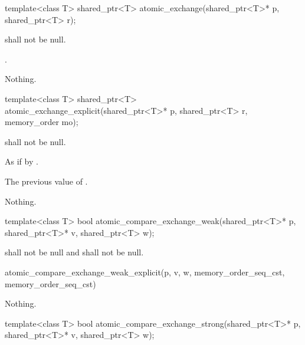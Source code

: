 %
\begin{itemdecl}
template<class T>
  shared_ptr<T> atomic_exchange(shared_ptr<T>* p, shared_ptr<T> r);
\end{itemdecl}

\begin{itemdescr}
\pnum
\requires {} shall not be null.

\pnum
\returns {}.

\pnum
\throws Nothing.
\end{itemdescr}

%
\begin{itemdecl}
template<class T>
  shared_ptr<T> atomic_exchange_explicit(shared_ptr<T>* p, shared_ptr<T> r, memory_order mo);
\end{itemdecl}

\begin{itemdescr}
\pnum
\requires {} shall not be null.

\pnum
\effects As if by .

\pnum
\returns The previous value of .

\pnum
\throws Nothing.
\end{itemdescr}

%
\begin{itemdecl}
template<class T>
  bool atomic_compare_exchange_weak(shared_ptr<T>* p, shared_ptr<T>* v, shared_ptr<T> w);
\end{itemdecl}

\begin{itemdescr}
\pnum
\requires {} shall not be null and  shall not be null.

\pnum
\returns
\begin{codeblock}
atomic_compare_exchange_weak_explicit(p, v, w, memory_order_seq_cst, memory_order_seq_cst)
\end{codeblock}

\pnum
\throws Nothing.
\end{itemdescr}

%
\begin{itemdecl}
template<class T>
  bool atomic_compare_exchange_strong(shared_ptr<T>* p, shared_ptr<T>* v, shared_ptr<T> w);
\end{itemdecl}

